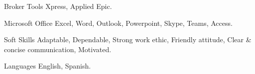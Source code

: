\vspace{-1.75mm}


\begin{cvskills}


\cvskill
{Broker Tools} %
{Xpress, Applied Epic.} %


\cvskill
{Microsoft Office} %
{Excel, Word, Outlook, Powerpoint, Skype, Teams, Access.} %



\cvskill
{Soft Skills} %
{Adaptable, Dependable, Strong work ethic, Friendly attitude, Clear \& concise communication, Motivated.} %


\cvskill
{Languages} %
{English, Spanish.} %


\end{cvskills}